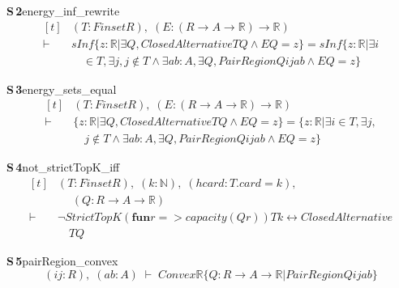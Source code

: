 \documentclass[conference]{IEEEtran}
\theoremstyle{definition}
\newcommand{\lean}[1]{\textsf{\footnotesize #1}}
\begin{document}
\noindent\textbf{S\,2}\quad\lean{energy\_inf\_rewrite}
{\footnotesize\[ \begin{aligned}[t]
&(\mathit{T} : \mathit{Finset} \mathit{R}),\; (\mathit{E} : (\mathit{R} \to \mathit{A} \to \mathbb{R} ) \to \mathbb{R} )\\
\vdash\;&\mathit{sInf} \{ \mathit{z} : \mathbb{R} | \exists \mathit{Q}, \mathit{ClosedAlternative} \mathit{T} \mathit{Q} \wedge \mathit{E} \mathit{Q} = \mathit{z}\} = \mathit{sInf} \{ \mathit{z} : \mathbb{R} | \exists \mathit{i}\\
&\quad \in \mathit{T}, \exists \mathit{j}, \mathit{j} \notin \mathit{T} \wedge \exists \mathit{a} \mathit{b} : \mathit{A}, \exists \mathit{Q}, \mathit{PairRegion} \mathit{Q} \mathit{i} \mathit{j} \mathit{a} \mathit{b} \wedge \mathit{E} \mathit{Q} = \mathit{z}\}
\end{aligned} \]}

\noindent\textbf{S\,3}\quad\lean{energy\_sets\_equal}
{\footnotesize\[ \begin{aligned}[t]
&(\mathit{T} : \mathit{Finset} \mathit{R}),\; (\mathit{E} : (\mathit{R} \to \mathit{A} \to \mathbb{R} ) \to \mathbb{R} )\\
\vdash\;&\{ \mathit{z} : \mathbb{R} | \exists \mathit{Q}, \mathit{ClosedAlternative} \mathit{T} \mathit{Q} \wedge \mathit{E} \mathit{Q} = \mathit{z}\} = \{ \mathit{z} : \mathbb{R} | \exists \mathit{i} \in \mathit{T}, \exists \mathit{j},\\
&\quad \mathit{j} \notin \mathit{T} \wedge \exists \mathit{a} \mathit{b} : \mathit{A}, \exists \mathit{Q}, \mathit{PairRegion} \mathit{Q} \mathit{i} \mathit{j} \mathit{a} \mathit{b} \wedge \mathit{E} \mathit{Q} = \mathit{z}\}
\end{aligned} \]}

\noindent\textbf{S\,4}\quad\lean{not\_strictTopK\_iff}
{\footnotesize\[ \begin{aligned}[t]
&(\mathit{T} : \mathit{Finset} \mathit{R}),\; (\mathit{k} : \mathbb{N} ),\; (\mathit{hcard} : \mathit{T}.\mathit{card} = \mathit{k}),\\
&\quad \; (\mathit{Q} : \mathit{R} \to \mathit{A} \to \mathbb{R} )\\
\vdash\;&\neg \mathit{StrictTopK} (\mathbf{fun} \mathit{r} => \mathit{capacity} (\mathit{Q} \mathit{r})) \mathit{T} \mathit{k} \leftrightarrow \mathit{ClosedAlternative}\\
&\quad \mathit{T} \mathit{Q}
\end{aligned} \]}

\noindent\textbf{S\,5}\quad\lean{pairRegion\_convex}
{\footnotesize\[ (\mathit{i} \mathit{j} : \mathit{R}),\; (\mathit{a} \mathit{b} : \mathit{A}) \;\vdash\; \mathit{Convex} \mathbb{R} \{ \mathit{Q} : \mathit{R} \to \mathit{A} \to \mathbb{R} | \mathit{PairRegion} \mathit{Q} \mathit{i} \mathit{j} \mathit{a} \mathit{b}\} \]}
\end{document}
